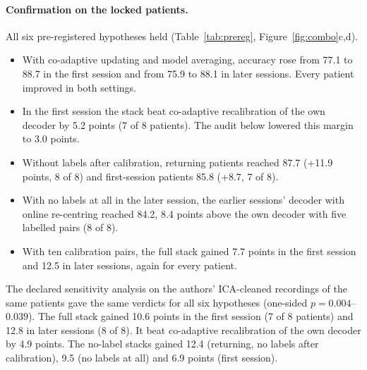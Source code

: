 \paragraph{Confirmation on the locked patients.} All six pre-registered hypotheses held (Table~\ref{tab:prereg}, Figure~\ref{fig:combo}c,d).
\begin{itemize}
  \item With co-adaptive updating and model averaging, accuracy rose from 77.1\pct{} to 88.7\pct{} in the first session and from 75.9\pct{} to 88.1\pct{} in later sessions. Every patient improved in both settings.
  \item In the first session the stack beat co-adaptive recalibration of the own decoder by 5.2 points (7 of 8 patients). The audit below lowered this margin to 3.0 points.
  \item Without labels after calibration, returning patients reached 87.7\pct{} (+11.9 points, 8 of 8) and first-session patients 85.8\pct{} (+8.7, 7 of 8).
  \item With no labels at all in the later session, the earlier sessions' decoder with online re-centring reached 84.2\pct{}, 8.4 points above the own decoder with five labelled pairs (8 of 8).
  \item With ten calibration pairs, the full stack gained 7.7 points in the first session and 12.5 in later sessions, again for every patient.
\end{itemize}
The declared sensitivity analysis on the authors' ICA-cleaned recordings of the same patients gave the same verdicts for all six hypotheses (one-sided $p = 0.004$--$0.039$). The full stack gained 10.6 points in the first session (7 of 8 patients) and 12.8 in later sessions (8 of 8). It beat co-adaptive recalibration of the own decoder by 4.9 points. The no-label stacks gained 12.4 (returning, no labels after calibration), 9.5 (no labels at all) and 6.9 points (first session).

